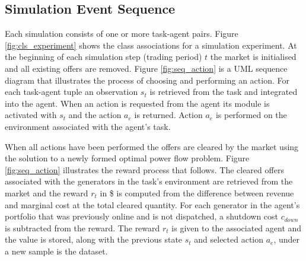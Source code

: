 

\subsection{Simulation Event Sequence}
Each simulation consists of one or more task-agent pairs.  Figure
\ref{fig:cls_experiment} shows the class associations for a simulation
experiment.  At the beginning of each simulation step (trading period) $t$ the
market is initialised and all existing offers are removed.  Figure
\ref{fig:seq_action} is a UML sequence diagram that illustrates the process of
choosing and performing an action.  For each task-agent tuple an observation
$s_t$ is retrieved from the task and integrated into the agent.  When an action
is requested from the agent its module is activated with $s_t$ and the action
$a_e$ is returned.  Action $a_e$ is performed on the environment associated with
the agent's task.


When all actions have been performed the offers are cleared by the market using
the solution to a newly formed optimal power flow problem.  Figure
\ref{fig:seq_action} illustrates the reward process that follows.  The cleared
offers associated with the generators in the task's environment are retrieved from the market and the
reward $r_t$ in \$ is computed from the difference between revenue and marginal
cost at the total cleared quantity.  For each generator in the agent's portfolio
that was previously online and is not dispatched, a shutdown cost $c_{down}$ is
subtracted from the reward.
The reward $r_t$ is given to the associated agent and the value is stored, along
with the previous state $s_t$ and selected action $a_e$, under a new sample is
the dataset.


